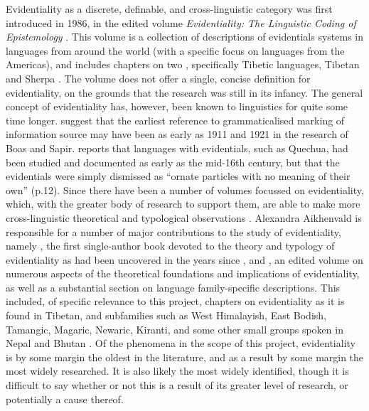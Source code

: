 Evidentiality as a discrete, definable, and cross-linguistic category was first introduced in 1986, in the edited volume \textit{Evidentiality: The Linguistic Coding of Epistemology} \cite{ChafeNichols1986}. This volume is a collection of descriptions of evidentials systems in languages from around the world (with a specific focus on languages from the Americas), and includes chapters on two \lfam, specifically Tibetic languages, Tibetan \cite{DeLancey1986} and Sherpa \cite{Woodbury1986}. The volume does not offer a single, concise definition for evidentiality, on the grounds that the research was still in its infancy. The general concept of evidentiality has, however, been known to linguistics for quite some time longer.  suggest that the earliest reference to grammaticalised marking of information source may have been as early as 1911 and 1921 in the research of Boas and Sapir.  reports that languages with evidentials, such as Quechua, had been studied and documented as early as the mid-16th century, but that the evidentials were simply dismissed as ``ornate particles with no meaning of their own'' (p.12). Since  there have been a number of volumes focussed on evidentiality, which, with the greater body of research to support them, are able to make more cross-linguistic theoretical and typological observations \cite{DendaleTasmowski2001}. Alexandra Aikhenvald is responsible for a number of major contributions to the study of evidentiality, namely , the first single-author book devoted to the theory and typology of evidentiality as had been uncovered in the years since , and , an edited volume on numerous aspects of the theoretical foundations and implications of evidentiality, as well as a substantial section on language family-specific descriptions. This included, of specific relevance to this project, chapters on evidentiality as it is found in Tibetan, and subfamilies such as West Himalayish, East Bodish, Tamangic, Magaric, Newaric, Kiranti, and some other small groups spoken in Nepal and Bhutan \cites{DeLancey2018Evidentiality}{Hyslop2018Evidentiality}. Of the phenomena in the scope of this project, evidentiality is by some margin the oldest in the literature, and as a result by some margin the most widely researched. It is also likely the most widely identified, though it is difficult to say whether or not this is a result of its greater level of research, or potentially a cause thereof.


